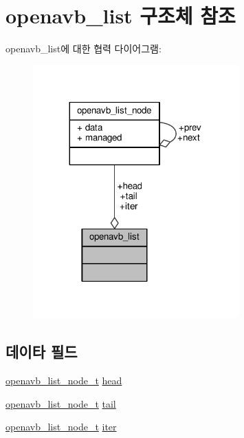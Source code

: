 \hypertarget{structopenavb__list}{}\section{openavb\+\_\+list 구조체 참조}
\label{structopenavb__list}


openavb\+\_\+list에 대한 협력 다이어그램\+:
\nopagebreak
\begin{figure}[H]
\begin{center}
\leavevmode
\includegraphics[width=224pt]{structopenavb__list__coll__graph}
\end{center}
\end{figure}
\subsection*{데이타 필드}
\begin{DoxyCompactItemize}
\item 
\hyperlink{openavb__list_8h_a64023766d95092523c9da1927b31c105}{openavb\+\_\+list\+\_\+node\+\_\+t} \hyperlink{structopenavb__list_af175e9f84f7aff58e5c89fe762ba6c51}{head}
\item 
\hyperlink{openavb__list_8h_a64023766d95092523c9da1927b31c105}{openavb\+\_\+list\+\_\+node\+\_\+t} \hyperlink{structopenavb__list_a73f16ebcb703df1b9bfa7dfc68a7ca6c}{tail}
\item 
\hyperlink{openavb__list_8h_a64023766d95092523c9da1927b31c105}{openavb\+\_\+list\+\_\+node\+\_\+t} \hyperlink{structopenavb__list_a5e9ddd716fff13022cd48692d2b18e7f}{iter}
\end{DoxyCompactItemize}


